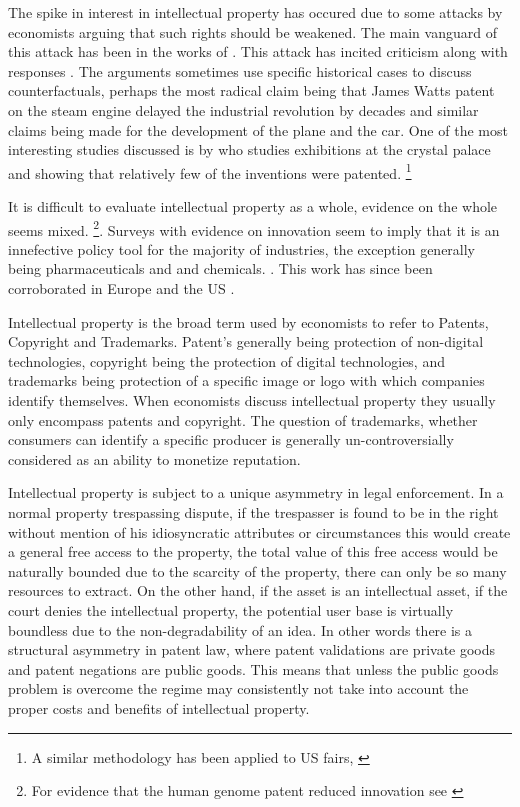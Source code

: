 \documentclass[12pt]{article}
\numberwithin{equation}{section}
\begin{document}
The spike in interest in intellectual property has occured due to some attacks by economists arguing that such rights should be weakened. The main vanguard of this attack has been in the works of \cite{dosi2006much} \cite{boldrinlevine}  \cite{bessen2008patent}. This attack has incited criticism \cite{scherer2009michele} along with responses \cite{boldrin2013s}. The arguments sometimes use specific historical cases to discuss counterfactuals, perhaps the most radical claim being that James Watts patent on the steam engine delayed the industrial revolution by decades \cite{boldrinlevine}\cite{nuvolari2004collective} and similar claims being made for the development of the plane and the car\cite{merges1994limiting}. One of the most interesting studies discussed is by \cite{moser2005patent} who studies exhibitions at the crystal palace and showing that relatively few of the inventions were patented\cite{moser2005patent}. \footnote{A similar methodology has been applied to US fairs, \cite{khan2013going}}


It is difficult to evaluate intellectual property as a whole, evidence on the whole seems mixed. \footnote{For evidence that the human genome patent reduced innovation see \cite{williams2013intellectual}}. Surveys with evidence on innovation seem to imply that it is an innefective policy tool for the majority of industries, the exception generally being pharmaceuticals and and chemicals. \cite{mansfield1986patents} \cite{levin1987appropriating}. This work has since been corroborated in Europe\cite{arundel1998percentage} and the US \cite{cohen2000protecting}. 

Intellectual property is the broad term used by economists to refer to Patents, Copyright and Trademarks. Patent's generally being protection of non-digital technologies, copyright being the protection of digital technologies, and trademarks being protection of a specific image or logo with which companies identify themselves. When economists discuss intellectual property they usually only encompass patents and copyright. The question of trademarks, whether consumers can identify a specific producer is generally un-controversially considered as an ability to monetize reputation.

Intellectual property is subject to a unique asymmetry in legal enforcement. In a normal property trespassing dispute, if the trespasser is found to be in the right without mention of his idiosyncratic attributes or circumstances this would create a general free access to the property, the total value of this free access would be naturally bounded due to the scarcity of the property, there can only be so many resources to extract. On the other hand, if the asset is an intellectual asset, if the court denies the intellectual property, the potential user base is virtually boundless due to the non-degradability of an idea. In other words there is a structural asymmetry in patent law, where patent validations are private goods and patent negations are public goods. This means that unless the public goods problem is overcome the regime may consistently not take into account the proper costs and benefits of intellectual property.
\end{document}
